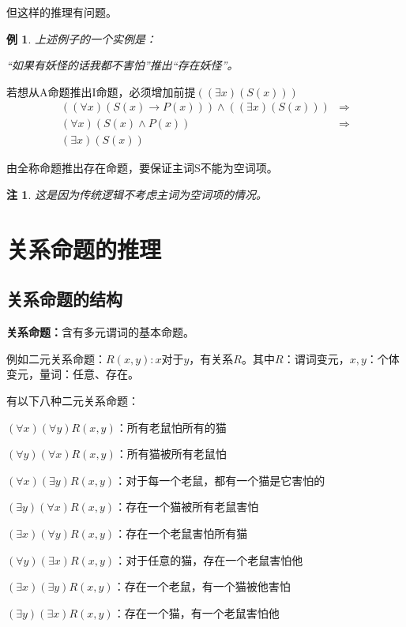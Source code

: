 \documentclass[12pt,onecolumn,a4paper]{book}
\newtheorem*{example}{例}
\newtheorem*{note}{注}
\numberwithin{table}{subsection}
\numberwithin{equation}{subsection}
\begin{document}
但这样的推理有问题。

\begin{example}
    上述例子的一个实例是：

    “如果有妖怪的话我都不害怕”推出“存在妖怪”。
\end{example}

若想从A命题推出I命题，必须增加前提$((\exists x)(S(x)))$
\begin{align*}
    ((\forall x)(S(x)\rightarrow P(x)))\wedge((\exists x)(S(x))) &\Rightarrow\\
    (\forall x)(S(x)\wedge P(x)) &\Rightarrow\\
    (\exists x)(S(x))
\end{align*}

由全称命题推出存在命题，要保证主词S不能为空词项。

\begin{note}
    这是因为传统逻辑不考虑主词为空词项的情况。
\end{note}

\chapter{关系命题的推理}\label{chap7}

\section{关系命题的结构}

\textbf{关系命题：}含有多元谓词的基本命题。

例如二元关系命题：$R(x,y):x\text{对于}y\text{，有关系}R$。其中$R$：谓词变元，$x,y$：个体变元，量词：任意、存在。

有以下八种二元关系命题：

$(\forall x)(\forall y)R(x,y)$：所有老鼠怕所有的猫

$(\forall y)(\forall x)R(x,y)$：所有猫被所有老鼠怕

$(\forall x)(\exists y)R(x,y)$：对于每一个老鼠，都有一个猫是它害怕的

$(\exists y)(\forall x)R(x,y)$：存在一个猫被所有老鼠害怕

$(\exists x)(\forall y)R(x,y)$：存在一个老鼠害怕所有猫

$(\forall y)(\exists x)R(x,y)$：对于任意的猫，存在一个老鼠害怕他

$(\exists x)(\exists y)R(x,y)$：存在一个老鼠，有一个猫被他害怕

$(\exists y)(\exists x)R(x,y)$：存在一个猫，有一个老鼠害怕他
\end{document}
